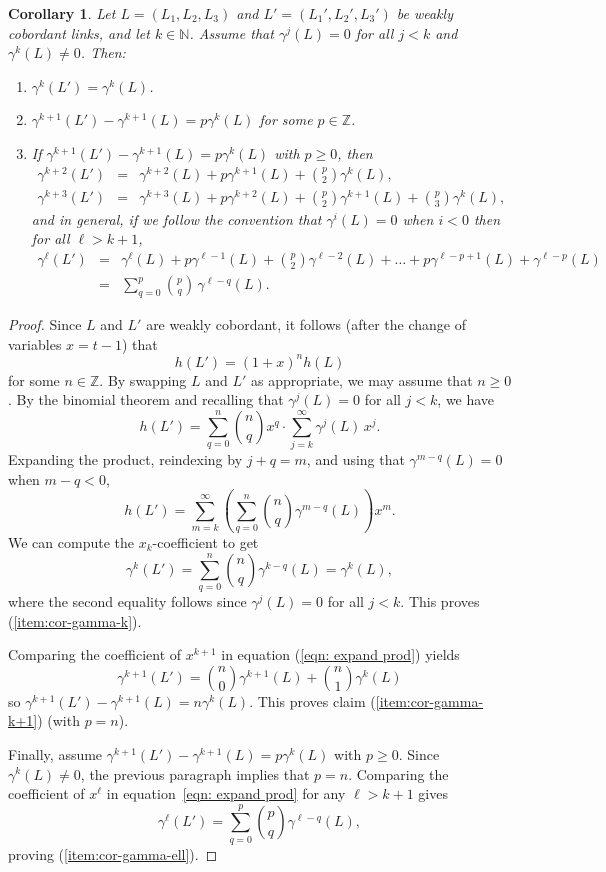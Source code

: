 \documentclass[10pt,a4paper]{amsart}
\newtheorem{corollary}{Corollary}
\newcommand{\N}{\mathbb{N}}
\newcommand{\Sum}{\displaystyle \sum}
\newcommand{\Z}{\mathbb{Z}}
\newcommand{\noteta}{h}
\newcommand{\pref}[1]{(\ref{#1})}
\begin{document}
\begin{corollary}\label{cor:lift}
Let $L=(L_1, L_2, L_3)$ and $L'=(L_1',L_2', L_3')$ be weakly cobordant links, and let $k\in \N$. Assume that $\gamma^j(L)=0$ for all $j<k$ and $\gamma^k(L)\neq 0$. Then:
\begin{enumerate}
\item \label{item:cor-gamma-k}
$\gamma^k(L')=\gamma^k(L)$.
\item \label{item:cor-gamma-k+1}
$\gamma^{k+1}(L')-\gamma^{k+1}(L)=p \gamma^k(L)$ for some $p\in \Z$.
\item \label{item:cor-gamma-ell}
If $\gamma^{k+1}(L')-\gamma^{k+1}(L)=p \gamma^k(L)$ with $p\ge 0$, then 
\begin{eqnarray*}\gamma^{k+2}(L')&=&\gamma^{k+2}(L)+p\gamma^{k+1}(L)+{p\choose 2}\gamma^k(L),\\
\gamma^{k+3}(L')&=&\gamma^{k+3}(L)+p\gamma^{k+2}(L)+{p\choose 2}\gamma^{k+1}(L)+{p\choose 3}\gamma^{k}(L),
\end{eqnarray*}
and in general, if we follow the convention that $\gamma^i(L)=0$ when $i<0$ then for all $\ell>k+1$,
\begin{eqnarray*}
\gamma^\ell(L') &=& \gamma^\ell(L)+p\gamma^{\ell-1}(L)+{p\choose 2}\gamma^{\ell-2}(L)+\dots + p\gamma^{\ell-p+1}(L)+\gamma^{\ell-p}(L) \\
&=& \sum_{q=0}^p {p\choose q}\,\gamma^{\ell-q}(L).
\end{eqnarray*}
\end{enumerate}
\end{corollary}

\begin{proof}
Since $L$ and $L'$ are weakly cobordant, it follows (after the change of variables $x=t-1$) that
$$
\noteta(L')=(1+x)^n\noteta(L)
$$
for some $n\in \Z$. By swapping $L$ and $L'$ as appropriate, we may assume that $n\ge 0$. By the binomial theorem and recalling that $\gamma^j(L)=0$ for all $j<k$, we have
$$\noteta(L')=\Sum_{q=0}^n {n\choose q}x^q\cdot \Sum_{j=k}^\infty \gamma^j(L)\,x^j.$$
Expanding the product, reindexing by $j+q=m$, and using that $\gamma^{m-q}(L)=0$ when $m-q<0$, 
\begin{equation}\label{eqn: expand prod}
\noteta(L')
=
\Sum_{m=k}^\infty
\left(\Sum_{q=0}^{n}{n\choose q}\gamma^{m-q}(L)\right)x^m.
\end{equation}
We can compute the $x_k$-coefficient to get
$$
\gamma^k(L')=\Sum_{q=0}^{n}{n\choose q}\gamma^{k-q}(L)=\gamma^k(L),
$$
where the second equality follows since $\gamma^j(L)=0$ for all $j<k$.  This proves \pref{item:cor-gamma-k}.

Comparing the coefficient of $x^{k+1}$ in equation \pref{eqn: expand prod} yields
$$
\gamma^{k+1}(L')={n\choose 0}\gamma^{k+1}(L)+{n\choose 1}\gamma^{k}(L)
$$
so $\gamma^{k+1}(L')-\gamma^{k+1}(L)=n \gamma^k(L)$. This proves claim \pref{item:cor-gamma-k+1} (with $p=n$).

Finally, assume $\gamma^{k+1}(L')-\gamma^{k+1}(L)=p \gamma^k(L)$ with $p\ge 0$. Since $\gamma^k(L)\neq 0$, the previous paragraph implies that $p=n$. Comparing the coefficient of $x^\ell$ in equation~\eqref{eqn: expand prod} for any $\ell>k+1$ gives
$$
\gamma^\ell(L')=\Sum_{q=0}^{p}{p\choose q}\gamma^{\ell-q}(L),
$$
proving \pref{item:cor-gamma-ell}.
\end{proof}
\end{document}
